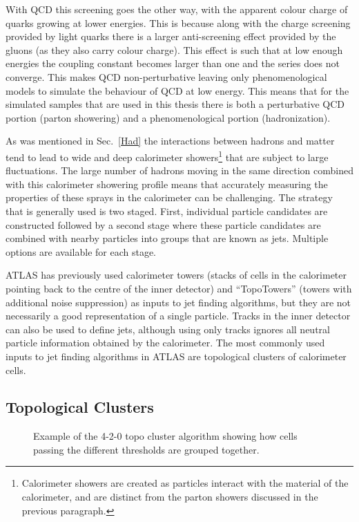 With QCD this screening goes the other way, with the apparent colour charge of quarks growing at lower energies.  
This is because along with the charge screening provided by light quarks there is a larger anti-screening effect provided by the gluons (as they also carry colour charge).  
This effect is such that at low enough energies the coupling constant becomes larger than one and the series does not converge.  
This makes QCD non-perturbative leaving only phenomenological models to simulate the behaviour of QCD at low energy.  
This means that for the simulated samples that are used in this thesis there is both a perturbative QCD portion (parton showering) and a phenomenological portion (hadronization).  

As was mentioned in Sec.~\ref{Had} the interactions between hadrons and matter tend to lead to wide and deep calorimeter showers\footnote{Calorimeter showers are created as particles interact with the material of the calorimeter, and are distinct from the parton showers discussed in the previous paragraph. } that are subject to large fluctuations.  
The large number of hadrons moving in the same direction combined with this calorimeter showering profile means that accurately measuring the properties of these sprays in the calorimeter can be challenging.  
The strategy that is generally used is two staged.  
First, individual particle candidates are constructed followed by a second stage where these particle candidates are combined with nearby particles into groups that are known as jets.  
Multiple options are available for each stage.  

ATLAS has previously used calorimeter towers (stacks of cells in the calorimeter pointing back to the centre of the inner detector) and ``TopoTowers'' (towers with additional noise suppression) as inputs to jet finding algorithms, but they are not necessarily a good representation of a single particle.  
Tracks in the inner detector can also be used to define jets, although using only tracks ignores all neutral particle information obtained by the calorimeter.  
The most commonly used inputs to jet finding algorithms in ATLAS are topological clusters of calorimeter cells.  
 
\subsection{Topological Clusters}
\label{Sec:Topocluster}
\begin{figure}[!ht]
  \begin{center}
  \end{center}
  \caption[Topoclustering diagram]
  {\small Example of the 4-2-0 topo cluster algorithm showing how cells passing the different thresholds are grouped together.  }
\end{figure}

